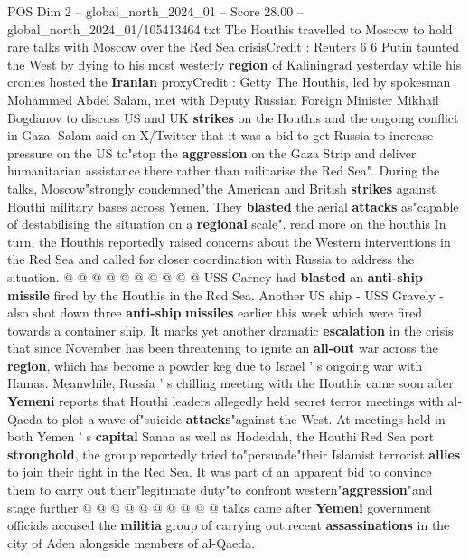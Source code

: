\begin{textsample}{POS Dim 2 – global\_north\_2024\_01 – Score 28.00 – global\_north\_2024\_01/105413464.txt}  \label{ex:f2_pos_109}
The Houthis travelled to Moscow to hold rare talks with Moscow over the Red Sea crisisCredit : Reuters 6 6 Putin taunted the West by flying to his most westerly \textbf{region} of Kaliningrad yesterday while his cronies hosted the \textbf{Iranian} proxyCredit : Getty The Houthis, led by spokesman Mohammed Abdel Salam, met with Deputy Russian Foreign Minister Mikhail Bogdanov to discuss US and UK \textbf{strikes} on the Houthis and the ongoing conflict in Gaza.
Salam said on X/Twitter that it was a bid to get Russia to increase pressure on the US to"stop the \textbf{aggression} on the Gaza Strip and deliver humanitarian assistance there rather than militarise the Red Sea".
During the talks, Moscow"strongly condemned"the American and British \textbf{strikes} against Houthi military bases across Yemen.
They \textbf{blasted} the aerial \textbf{attacks} as"capable of destabilising the situation on a \textbf{regional} scale". read more on the houthis In turn, the Houthis reportedly raised concerns about the Western interventions in the Red Sea and called for closer coordination with Russia to address the situation. @ @ @ @ @ @ @ @ @ @ USS Carney had \textbf{blasted} an \textbf{anti-ship} \textbf{missile} fired by the Houthis in the Red Sea.
Another US ship - USS Gravely - also shot down three \textbf{anti-ship} \textbf{missiles} earlier this week which were fired towards a container ship.
It marks yet another dramatic \textbf{escalation} in the crisis that since November has been threatening to ignite an \textbf{all-out} war across the \textbf{region}, which has become a powder keg due to Israel ' s ongoing war with Hamas.
Meanwhile, Russia ' s chilling meeting with the Houthis came soon after \textbf{Yemeni} reports that Houthi leaders allegedly held secret terror meetings with al-Qaeda to plot a wave of"suicide \textbf{attacks}"against the West.
At meetings held in both Yemen ' s \textbf{capital} Sanaa as well as Hodeidah, the Houthi Red Sea port \textbf{stronghold}, the group reportedly tried to"persuade"their Islamist terrorist \textbf{allies} to join their fight in the Red Sea.
It was part of an apparent bid to convince them to carry out their"legitimate duty"to confront western"\textbf{aggression}"and stage further @ @ @ @ @ @ @ @ @ @ talks came after \textbf{Yemeni} government officials accused the \textbf{militia} group of carrying out recent \textbf{assassinations} in the city of Aden alongside members of al-Qaeda.

\end{textsample}
